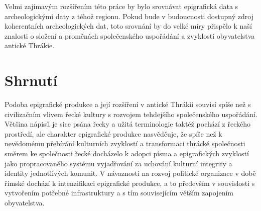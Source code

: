 Velmi zajímavým rozšířením této práce by bylo srovnávat epigrafická data s archeologickými daty z téhož regionu. Pokud bude v budoucnosti dostupný zdroj koherentních archeologických dat, toto srovnání by do velké míry přispělo k naší znalosti o složení a proměnách společenského uspořádání a zvyklostí obyvatelstva antické Thrákie.

\section[shrnutí-26]{Shrnutí}

Podoba epigrafické produkce a její rozšíření v antické Thrákii souvisí spíše než s civilizačním vlivem řecké kultury s rozvojem tehdejšího společenského uspořádání. Většina nápisů je sice psána řecky a užitá terminologie taktéž pochází z řeckého prostředí, ale charakter epigrafické produkce nasvědčuje, že spíše než k nevědomému přebírání kulturních zvyklostí a transformaci thrácké společnosti směrem ke společnosti řecké docházelo k adopci písma a epigrafických zvyklostí jako propracovaného systému vyjadřování za uchování kulturní integrity a identity jednotlivých komunit. V návaznosti na rozvoj politické organizace v době římské dochází k intenzifikaci epigrafické produkce, a to především v souvislosti s vytvořením potřebné infrastruktury a s tím souvisejícím větším zapojením obyvatelstva.
